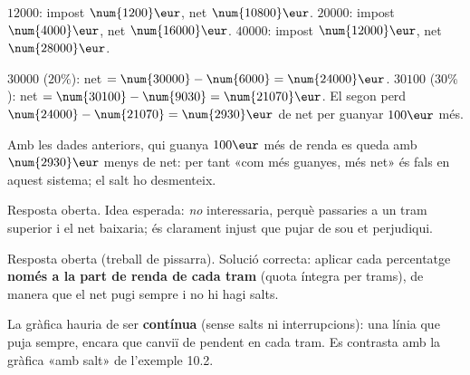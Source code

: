 \begin{solucions}
\begin{sollist}
  \item $\num{12000}$: impost $\num{1200}\eur$, net $\num{10800}\eur$. \quad
        $\num{20000}$: impost $\num{4000}\eur$, net $\num{16000}\eur$. \quad
        $\num{40000}$: impost $\num{12000}\eur$, net $\num{28000}\eur$.
  \item $\num{30000}$ ($20\%$): net $=\num{30000}-\num{6000}=\num{24000}\eur$.
        $\num{30100}$ ($30\%$): net $=\num{30100}-\num{9030}=\num{21070}\eur$. El segon
        perd $\num{24000}-\num{21070}=\num{2930}\eur$ de net per guanyar $100\eur$ més.
  \item Amb les dades anteriors, qui guanya $100\eur$ més de renda es queda amb
        $\num{2930}\eur$ menys de net: per tant «com més guanyes, més net» és fals en
        aquest sistema; el salt ho desmenteix.
  \item Resposta oberta. Idea esperada: \emph{no} interessaria, perquè passaries a un
        tram superior i el net baixaria; és clarament injust que pujar de sou et
        perjudiqui.
  \item Resposta oberta (treball de pissarra). Solució correcta: aplicar cada
        percentatge \textbf{només a la part de renda de cada tram} (quota íntegra per
        trams), de manera que el net pugi sempre i no hi hagi salts.
  \item La gràfica hauria de ser \textbf{contínua} (sense salts ni interrupcions):
        una línia que puja sempre, encara que canviï de pendent en cada tram. Es
        contrasta amb la gràfica «amb salt» de l'exemple 10.2.
\end{sollist}
\end{solucions}
